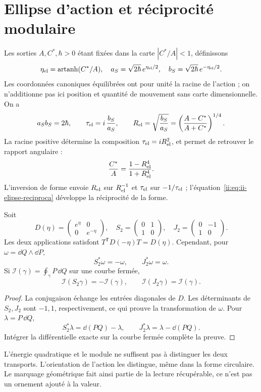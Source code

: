 \section{Ellipse d’action et réciprocité modulaire}
\label{ii:sec:ellipse} Les sorties $A,C^*,\hbar>0$ étant fixées dans la carte $|C^*/A|<1$, définissons
\[
\eta_{\rm el}=\operatorname{artanh}(C^*/A),\quad
a_S=\sqrt{2\hbar}\,e^{\eta_{\rm el}/2},\quad
b_S=\sqrt{2\hbar}\,e^{-\eta_{\rm el}/2}.
\]
Les coordonnées canoniques équilibrées ont pour unité la racine de l’action ; on n’additionne pas ici position et quantité de mouvement sans carte dimensionnelle. On a
\[
a_Sb_S=2\hbar,\qquad
\tau_{\rm el}=i\,\frac{b_S}{a_S},\qquad
R_{\rm el}=\sqrt{\frac{b_S}{a_S}}
=\left(\frac{A-C^*}{A+C^*}\right)^{1/4}.
\]
La racine positive détermine la composition $\tau_{\rm el}=iR_{\rm el}^2$,
et permet de retrouver le rapport angulaire :
\[
\frac{C^*}{A}=\frac{1-R_{\rm el}^4}{1+R_{\rm el}^4}.
\]
L’inversion de forme envoie $R_{\rm el}$ sur $R_{\rm el}^{-1}$ et $\tau_{\rm el}$ sur $-1/\tau_{\rm el}$ ; l’équation~\eqref{ii:eq:ii-elipse-reciproca} développe la réciprocité de la forme.

\begin{proposition}
Soit
\[
D(\eta)=\begin{pmatrix}e^\eta&0\\0&e^{-\eta}\end{pmatrix},
\quad
S_2=\begin{pmatrix}0&1\\1&0\end{pmatrix},
\quad
J_2=\begin{pmatrix}0&-1\\1&0\end{pmatrix}.
\]
Les deux applications satisfont $T^{\mathsf T}D(-\eta)T=D(\eta)$.
Cependant, pour $\omega=\dd Q\wedge\dd P$,
\[
S_2^*\omega=-\omega,\qquad J_2^*\omega=\omega.
\]
Si $\mathcal I(\gamma)=\oint_\gamma P\,\dd Q$ sur une courbe fermée,
\[
\mathcal I(S_2\gamma)=-\mathcal I(\gamma),\qquad
\mathcal I(J_2\gamma)=\mathcal I(\gamma).
\]
\end{proposition}
\begin{proof}
La conjugaison échange les entrées diagonales de $D$.
Les déterminants de $S_2,J_2$ sont $-1,1$, respectivement, ce qui
prouve la transformation de $\omega$. Pour $\lambda=P\,\dd Q$,
\[
S_2^*\lambda=\dd(PQ)-\lambda,\qquad
J_2^*\lambda=\lambda-\dd(PQ).
\]
Intégrer la différentielle exacte sur la courbe fermée complète la preuve.
\end{proof}

L’énergie quadratique et le module ne suffisent pas à distinguer les deux
transports. L’orientation de l’action les distingue, même
dans la forme circulaire. Le marquage géométrique fait ainsi partie de la lecture
récupérable, ce n’est pas un ornement ajouté à la valeur.


